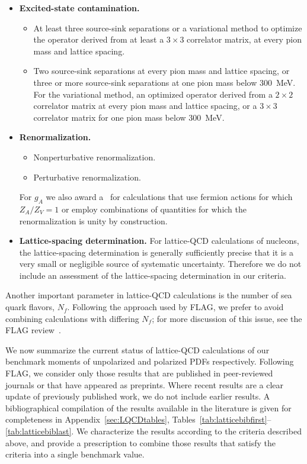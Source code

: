 \begin{itemize}
\item {\bfseries Excited-state contamination.}
%
\begin{itemize}
%
\item[\bstar] At least three source-sink separations or a variational method 
to optimize the operator derived from at least a $3\times 3$ correlator matrix, 
at every pion mass and lattice spacing.
% 
\item[\bcirc] Two source-sink separations at every pion mass and lattice 
spacing, or three or more source-sink separations at one pion mass below 
300~MeV.
%
For the variational method, an optimized operator derived from a $2\times 2$ 
correlator matrix at every pion mass and lattice spacing, or a $3\times 3$ 
correlator matrix for one pion mass below 300~MeV.
%
\end{itemize}

\item {\bfseries Renormalization.}
\begin{itemize}
%
\item[\bstar] Nonperturbative renormalization.
%
\item[\bcirc] Perturbative renormalization.
%
\end{itemize}
%
For $g_A$ we also award a \bstar~for calculations that use fermion actions 
for which $Z_A/Z_V=1$ or employ combinations of quantities for which the 
renormalization is unity by construction.

\item {\bfseries Lattice-spacing determination.}
For lattice-QCD calculations of nucleons, the lattice-spacing determination is 
generally sufficiently precise that it is a very small or negligible source
of systematic uncertainty. 
%
Therefore we do not include an assessment of the lattice-spacing
determination in our criteria.

\end{itemize}

Another important parameter in lattice-QCD calculations is the number of sea 
quark flavors, $N_f$. 
%
Following the approach used by FLAG, we prefer to avoid combining calculations 
with differing $N_f$; for more discussion of this issue, see the FLAG 
review~\cite{Aoki:2016frl}.

We now summarize the current status of lattice-QCD calculations of
our benchmark moments of unpolarized and polarized PDFs respectively.
%
Following FLAG, we consider only those results that are published in 
peer-reviewed journals or that have appeared as preprints. 
%
Where recent results are a clear update of previously published work, we do 
not include earlier results.
%
A bibliographical compilation of the results available in the literature 
is given for completeness in Appendix~\ref{sec:LQCDtables},
Tables~\ref{tab:latticebibfirst}--\ref{tab:latticebiblast}.
%
We characterize the results according to the criteria 
described above, and provide a prescription to combine those results that 
satisfy the criteria into a single benchmark value.

